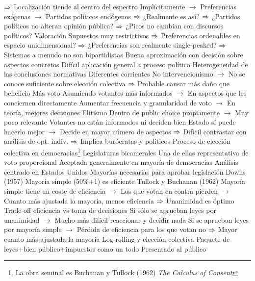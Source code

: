 \documentclass{nuevotema}
\begin{document}
\begin{esquemal}
				\4[] $\Rightarrow$ Localización tiende al centro del espectro
				\4[] Implícitamente
				\4[] $\to$ Preferencias exógenas
				\4[] $\to$ Partidos políticos endógenos
				\4[] $\Rightarrow$ ¿Realmente es así?
				\4[] $\Rightarrow$ ¿Partidos políticos no alteran opinión pública?
				\4[] $\Rightarrow$ ¿Picos no cambian con discursos políticos?
				\4 Valoración
				\4[] Supuestos muy restrictivos
				\4[] $\Rightarrow$ Preferencias ordenables en espacio unidimensional?
				\4[] $\Rightarrow$ ¿Preferencias son realmente single-peaked?
				\4[] $\Rightarrow$ Sistemas a menudo no son bipartidistas
				\4[] Buena aproximación con decisión sobre aspectos concretos
				\4[] Difícil aplicación general a proceso político
			\3 Heterogeneidad de las conclusiones normativas
				\4 Diferentes corrientes
				\4 No intervencionismo
				\4[] $\to$ No se conoce suficiente sobre elección colectiva
				\4[] $\Rightarrow$ Probable causar más daño que beneficio
				\4 Más voto
				\4[] Asumiendo votantes más informados
				\4[] $\to$ En aspectos que les conciernen directamente
				\4[] Aumentar frecuencia y granularidad de voto
				\4[] $\to$ En teoría, mejores decisiones
				\4 Elitismo
				\4[] Dentro de public choice propiamente
				\4[] $\to$ Muy poco relevante
				\4[] Votantes no están informados ni deciden bien
				\4[] Estado sí puede hacerlo mejor
				\4[] $\to$ Decide en mayor número de aspectos
				\4[] $\Rightarrow$ Difícil contrastar con análisis de opt. indiv.
				\4[] $\Rightarrow$ Implica burócratas y políticos
			\3 Proceso de elección colectiva en democracias\footnote{La obra seminal es Buchanan y Tullock (1962) \textit{The Calculus of Consent}}
				\4 Legislaturas bicamerales
				\4[] Una de ellas representativa de voto proporcional
				\4 Aceptada generalmente en mayoría de democracias
				\4 Análisis centrado en Estados Unidos
			\3 Mayorías necesarias para aprobar legislación
				\4 Downs (1957)
				\4[] Mayoría simple (50\%+1) es eficiente
				\4 Tullock y Buchanan (1962)
				\4[] Mayoría simple tiene un coste de eficiencia
				\4[] $\to$ Los que votan en contra pierden
				\4[] $\to$ Cuanto más ajustada la mayoría, menos eficiencia
				\4[] $\Rightarrow$ Unanimidad es óptimo
				\4 Trade-off eficiencia vs toma de decisiones
				\4[] Si sólo se aprueban leyes por unanimidad
				\4[] $\to$ Mucho más difícil reaccionar y decidir nada
				\4[] Si se aprueban leyes por mayoría simple
				\4[] $\to$ Pérdida de eficiencia para los que votan no
				\4[] $\Rightarrow$ Mayor cuanto más ajustada la mayoría
			\3 Log-rolling y elección colectiva
				\4 Paquete de leyes+bien público+impuestos como un todo
				\4[] Presentado al público

\end{esquemal}
\end{document}
